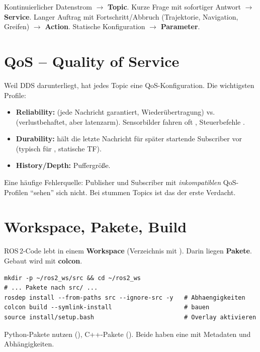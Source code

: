 \begin{infobox}[title=Faustregel zur Wahl]
Kontinuierlicher Datenstrom $\rightarrow$ \textbf{Topic}.
Kurze Frage mit sofortiger Antwort $\rightarrow$ \textbf{Service}.
Langer Auftrag mit Fortschritt/Abbruch (Trajektorie, Navigation, Greifen)
$\rightarrow$ \textbf{Action}.
Statische Konfiguration $\rightarrow$ \textbf{Parameter}.
\end{infobox}

\section{QoS -- Quality of Service}
Weil DDS darunterliegt, hat jedes Topic eine QoS-Konfiguration. Die wichtigsten
Profile:
\begin{itemize}
\item \textbf{Reliability:}  (jede Nachricht garantiert,
  Wiederübertragung) vs.\  (verlustbehaftet, aber
  latenzarm). Sensorbilder fahren oft , Steuerbefehle
  .
\item \textbf{Durability:}  hält die letzte Nachricht für
  später startende Subscriber vor (typisch für , statische TF).
\item \textbf{History/Depth:} Puffergröße.
\end{itemize}
Eine häufige Fehlerquelle: Publisher und Subscriber mit \emph{inkompatiblen}
QoS-Profilen ``sehen'' sich nicht. Bei stummen Topics ist das der erste Verdacht.

\section{Workspace, Pakete, Build}
ROS\,2-Code lebt in einem \textbf{Workspace} (Verzeichnis mit ).
Darin liegen \textbf{Pakete}. Gebaut wird mit \textbf{colcon}.
\begin{lstlisting}[style=bash,caption={Workspace anlegen und bauen}]
mkdir -p ~/ros2_ws/src && cd ~/ros2_ws
# ... Pakete nach src/ ...
rosdep install --from-paths src --ignore-src -y   # Abhaengigkeiten
colcon build --symlink-install                    # bauen
source install/setup.bash                         # Overlay aktivieren
\end{lstlisting}
Python-Pakete nutzen  (), C++-Pakete
 (). Beide haben eine
 mit Metadaten und Abhängigkeiten.

